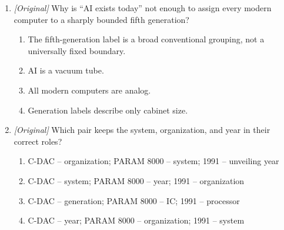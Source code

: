 \begin{enumerate}[label=\textbf{Q\arabic*.}, leftmargin=*]
\begin{enumerate}[label=\Alph*.]
    \item Select third generation; fourth is the microprocessor association.
    \item Select second generation; it introduced transistors.
    \item Select first generation; it introduced vacuum tubes.
    \item Select fifth generation; it introduced AI.
  \end{enumerate}
\item \textit{[Original]} Why is ``AI exists today'' not enough to assign
  every modern computer to a sharply bounded fifth generation?
  \begin{enumerate}[label=\Alph*.]
    \item The fifth-generation label is a broad conventional grouping, not a
      universally fixed boundary.
    \item AI is a vacuum tube.
    \item All modern computers are analog.
    \item Generation labels describe only cabinet size.
  \end{enumerate}
\item \textit{[Original]} Which pair keeps the system, organization, and
  year in their correct roles?
  \begin{enumerate}[label=\Alph*.]
    \item C-DAC -- organization; PARAM 8000 -- system; 1991 -- unveiling year
    \item C-DAC -- system; PARAM 8000 -- year; 1991 -- organization
    \item C-DAC -- generation; PARAM 8000 -- IC; 1991 -- processor
    \item C-DAC -- year; PARAM 8000 -- organization; 1991 -- system
  \end{enumerate}


\end{enumerate}
